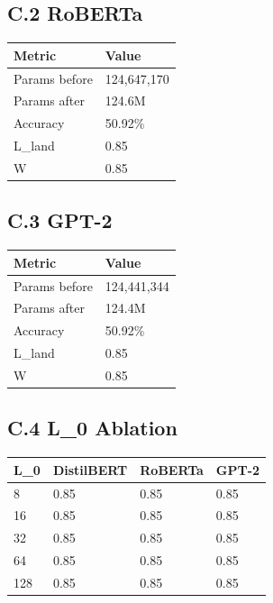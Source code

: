 \subsection{C.2 RoBERTa}

\begin{table}[H]
\centering
\small
\begin{tabular}{ll}
\toprule
\textbf{Metric} & \textbf{Value} \\
\midrule
Params before & 124,647,170 \\
Params after & 124.6M \\
Accuracy & 50.92\% \\
L\_land & 0.85 \\
W & 0.85 \\
\bottomrule
\end{tabular}
\end{table}

\subsection{C.3 GPT-2}

\begin{table}[H]
\centering
\small
\begin{tabular}{ll}
\toprule
\textbf{Metric} & \textbf{Value} \\
\midrule
Params before & 124,441,344 \\
Params after & 124.4M \\
Accuracy & 50.92\% \\
L\_land & 0.85 \\
W & 0.85 \\
\bottomrule
\end{tabular}
\end{table}

\subsection{C.4 L\_0 Ablation}

\begin{table}[H]
\centering
\small
\begin{tabular}{llll}
\toprule
\textbf{L\_0} & \textbf{DistilBERT} & \textbf{RoBERTa} & \textbf{GPT-2} \\
\midrule
8 & 0.85 & 0.85 & 0.85 \\
16 & 0.85 & 0.85 & 0.85 \\
32 & 0.85 & 0.85 & 0.85 \\
64 & 0.85 & 0.85 & 0.85 \\
128 & 0.85 & 0.85 & 0.85 \\
\bottomrule
\end{tabular}
\end{table}

